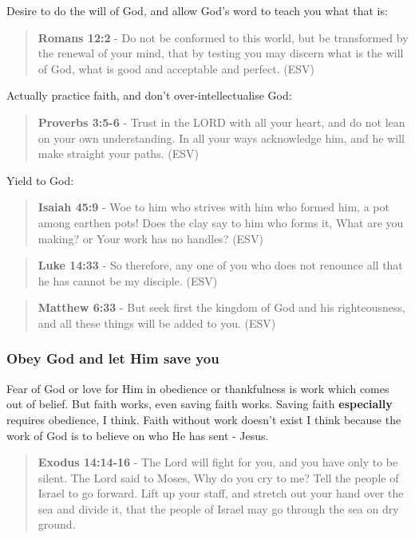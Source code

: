 \documentclass[11pt]{article}
\begin{document}
Desire to do the will of God, and allow God's word to teach you what that is:

\begin{quote}
\textbf{Romans 12:2} - Do not be conformed to this world, but be transformed by the renewal of your mind, that by testing you may discern what is the will of God, what is good and acceptable and perfect. (ESV)
\end{quote}

Actually practice faith, and don't over-intellectualise God:

\begin{quote}
\textbf{Proverbs 3:5-6} - Trust in the LORD with all your heart, and do not lean on your own understanding. In all your ways acknowledge him, and he will make straight your paths. (ESV)
\end{quote}

Yield to God:

\begin{quote}
\textbf{Isaiah 45:9} - Woe to him who strives with him who formed him, a pot among earthen pots! Does the clay say to him who forms it, What are you making? or Your work has no handles? (ESV)
\end{quote}

\begin{quote}
\textbf{Luke 14:33} - So therefore, any one of you who does not renounce all that he has cannot be my disciple. (ESV)
\end{quote}

\begin{quote}
\textbf{Matthew 6:33} - But seek first the kingdom of God and his righteousness, and all these things will be added to you. (ESV)
\end{quote}

\subsubsection{Obey God and let Him save you}
\label{sec:org9bdf7eb}

Fear of God or love for Him in obedience or thankfulness is work which comes out of belief.
But faith works, even saving faith works. Saving faith \textbf{especially} requires obedience, I think.
Faith without work doesn't exist I think because the work of God is to believe on who He has sent - Jesus.

\begin{quote}
\textbf{Exodus 14:14-16} - The Lord will fight for you, and you have only to be silent.  The Lord said to Moses, Why do you cry to me? Tell the people of Israel to go forward.  Lift up your staff, and stretch out your hand over the sea and divide it, that the people of Israel may go through the sea on dry ground.
\end{quote}
\end{document}
